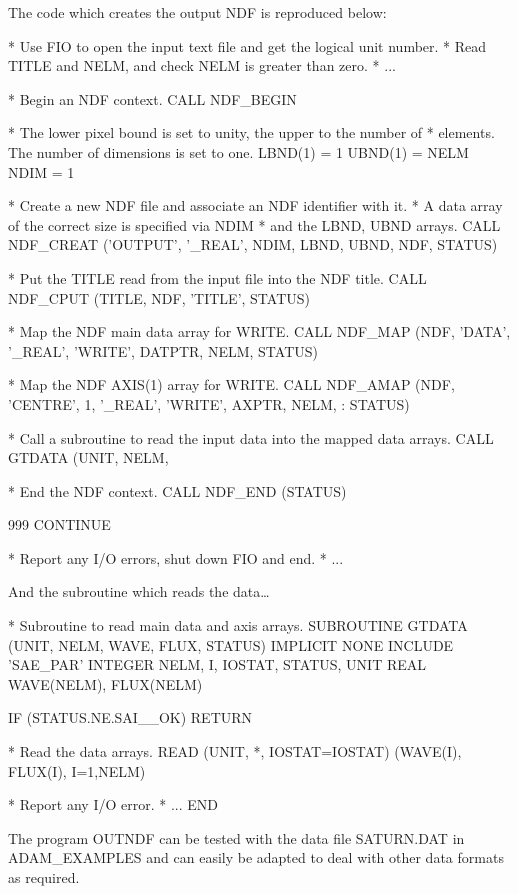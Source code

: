 \documentclass[twoside,11pt,nolof]{starlink}
\begin{document}
The code which creates the output NDF is reproduced below:
\begin{terminalv}
*  Use FIO to open the input text file and get the logical unit number.
*  Read TITLE and NELM, and check NELM is greater than zero.
*   ...

*   Begin an NDF context.
      CALL NDF_BEGIN

*  The lower pixel bound is set to unity, the upper to the number of
*  elements. The number of dimensions is set to one.
      LBND(1) = 1
      UBND(1) = NELM
      NDIM = 1

*   Create a new NDF file and associate an NDF identifier with it.
*   A data array of the correct size is specified via NDIM
*   and the LBND, UBND arrays.
      CALL NDF_CREAT ('OUTPUT', '_REAL', NDIM, LBND, UBND, NDF, STATUS)

*   Put the TITLE read from the input file into the NDF title.
      CALL NDF_CPUT (TITLE, NDF, 'TITLE', STATUS)

*   Map the NDF main data array for WRITE.
      CALL NDF_MAP (NDF, 'DATA', '_REAL', 'WRITE', DATPTR, NELM, STATUS)

*   Map the NDF AXIS(1) array for WRITE.
      CALL NDF_AMAP (NDF, 'CENTRE', 1, '_REAL', 'WRITE', AXPTR, NELM,
     :               STATUS)

*   Call a subroutine to read the input data into the mapped data arrays.
      CALL GTDATA (UNIT, NELM, %

*   End the NDF context.
      CALL NDF_END (STATUS)

999   CONTINUE

*   Report any I/O errors, shut down FIO and end.
*    ...
\end{terminalv}
And the subroutine which reads the data\ldots
\begin{terminalv}
*   Subroutine to read main data and axis arrays.
      SUBROUTINE GTDATA (UNIT, NELM, WAVE, FLUX, STATUS)
      IMPLICIT NONE
      INCLUDE 'SAE_PAR'
      INTEGER NELM, I, IOSTAT, STATUS, UNIT
      REAL WAVE(NELM), FLUX(NELM)

      IF (STATUS.NE.SAI__OK) RETURN

*   Read the data arrays.
      READ (UNIT, *, IOSTAT=IOSTAT) (WAVE(I), FLUX(I), I=1,NELM)

*   Report any I/O error.
*    ...
      END
\end{terminalv}
The program OUTNDF can be tested with the data file SATURN.DAT in
ADAM\_EXAMPLES and can easily be adapted to deal with other data formats
as required.
\end{document}

